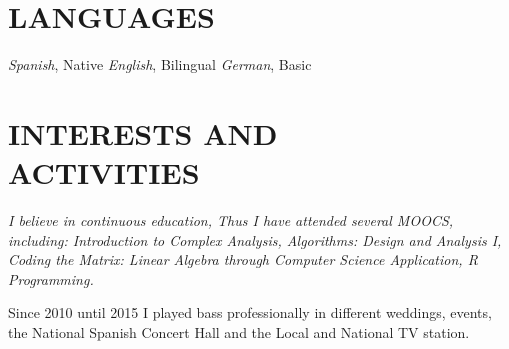 \documentclass[margin, 10pt]{resume} %
\begin{document}
\begin{resume}
\section{LANGUAGES}

{\sl Spanish}, Native
\bullet
{\sl English}, Bilingual
\bullet
{\sl German}, Basic


\section{INTERESTS AND \\ ACTIVITIES} 
\sl{I believe in continuous education}, \sl{Thus I have attended several MOOCS, including:
Introduction to Complex Analysis}, 
\sl{Algorithms: Design and Analysis I}, 
\sl{Coding the Matrix: Linear Algebra through Computer Science Application}, 
\sl{R Programming}.

Since 2010 until 2015 I played bass professionally in different weddings, events, the National Spanish Concert Hall and the Local and National TV station.

\end{resume}
\end{document}
